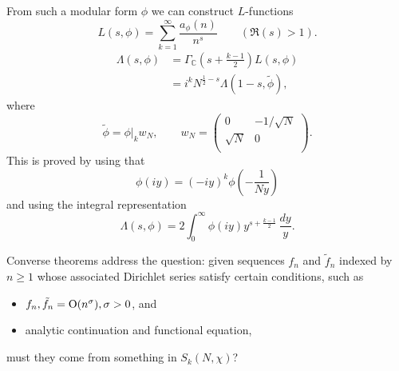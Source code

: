 \documentclass[reqno]{amsart} 
\begin{document}
From such a modular form $\phi$ we can construct $L$-functions
\begin{equation*}
  L (s, \phi )
  = \sum_{k = 1}^\infty
  \frac{a_\phi (n)}{ n^s }
  \qquad (\Re(s) > 1).
\end{equation*}
\begin{align*}
  \Lambda (s, \phi ) &= \Gamma_{\mathbb{C} } \left( s + \frac{k - 1 }{ 2} \right) L (s, \phi )  \\
                     &= i^k N^{\tfrac{1}{2} - s } \Lambda (1 - s, \tilde{\phi }),
\end{align*}
where
\begin{equation*}
  \tilde{\phi} = \phi|_k w_N, \qquad
  w_N =
  \begin{pmatrix}
    0 & - 1/\sqrt{N} \\
    \sqrt{N} & 0 \\
  \end{pmatrix}.
\end{equation*}
This is proved by using that
\begin{equation*}
  \phi (i y ) = (- i y )^k \phi \left( - \frac{1}{N y} \right)
\end{equation*}
and using the integral representation
\begin{equation*}
  \Lambda (s, \phi ) = 2 \int_0^\infty \phi (i y )
  y^{s + \frac{k - 1 }{2}}
  \, \frac{d y}{y}.
\end{equation*}

Converse theorems address the question: given sequences $f_n$ and $\tilde{f}_n$ indexed by $n \geq 1$ whose associated Dirichlet series satisfy certain conditions, such as
\begin{itemize}
\item $f_n, \tilde{f}_n = \operatorname{O} (n^\sigma ), \sigma > 0$, and
\item analytic continuation and functional equation,
\end{itemize}
must they come from something in $S_k (N, \chi )$?
\end{document}
